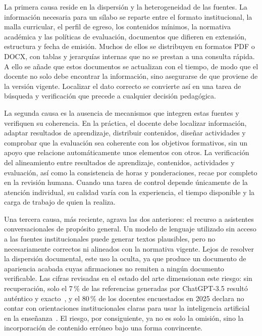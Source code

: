 La primera causa reside en la dispersión y la heterogeneidad de las fuentes. La información necesaria para un sílabo se reparte entre el formato institucional, la malla curricular, el perfil de egreso, los contenidos mínimos, la normativa académica y las políticas de evaluación, documentos que difieren en extensión, estructura y fecha de emisión. Muchos de ellos se distribuyen en formatos PDF o DOCX, con tablas y jerarquías internas que no se prestan a una consulta rápida. A ello se añade que estos documentos se actualizan con el tiempo, de modo que el docente no solo debe encontrar la información, sino asegurarse de que proviene de la versión vigente. Localizar el dato correcto se convierte así en una tarea de búsqueda y verificación que precede a cualquier decisión pedagógica.

La segunda causa es la ausencia de mecanismos que integren estas fuentes y verifiquen su coherencia. En la práctica, el docente debe localizar información, adaptar resultados de aprendizaje, distribuir contenidos, diseñar actividades y comprobar que la evaluación sea coherente con los objetivos formativos, sin un apoyo que relacione automáticamente unos elementos con otros. La verificación del alineamiento entre resultados de aprendizaje, contenidos, actividades y evaluación, así como la consistencia de horas y ponderaciones, recae por completo en la revisión humana. Cuando una tarea de control depende únicamente de la atención individual, su calidad varía con la experiencia, el tiempo disponible y la carga de trabajo de quien la realiza.

Una tercera causa, más reciente, agrava las dos anteriores: el recurso a asistentes conversacionales de propósito general. Un modelo de lenguaje utilizado sin acceso a las fuentes institucionales puede generar textos plausibles, pero no necesariamente correctos ni alineados con la normativa vigente. Lejos de resolver la dispersión documental, este uso la oculta, ya que produce un documento de apariencia acabada cuyas afirmaciones no remiten a ningún documento verificable. Las cifras revisadas en el estado del arte dimensionan este riesgo: sin recuperación, solo el 7\,\% de las referencias generadas por ChatGPT-3.5 resultó auténtico y exacto~\cite{bhattacharyya2023fabricated}, y el 80\,\% de los docentes encuestados en 2025 declara no contar con orientaciones institucionales claras para usar la inteligencia artificial en la enseñanza~\cite{dec2025survey}. El riesgo, por consiguiente, ya no es solo la omisión, sino la incorporación de contenido erróneo bajo una forma convincente.

